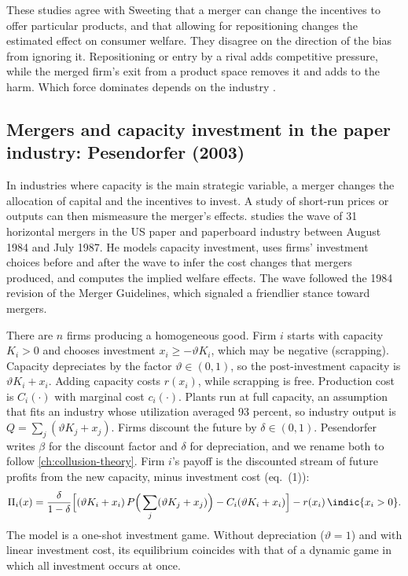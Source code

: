 These studies agree with Sweeting that a merger can change the incentives to offer particular products, and that
allowing for repositioning changes the estimated effect on consumer welfare. They disagree on the direction of the
bias from ignoring it. Repositioning or entry by a rival adds competitive pressure, while the merged firm's exit from
a product space removes it and adds to the harm. Which force dominates depends on the industry
\citep[p.~237]{AskerNocke2021}.

\subsection{Mergers and capacity investment in the paper industry: Pesendorfer (2003)}\label{sec:11-pesendorfer}

In industries where capacity is the main strategic variable, a merger changes the allocation of capital and the
incentives to invest. A study of short-run prices or outputs can then mismeasure the merger's effects.
\citet{Pesendorfer2003} studies the wave of 31 horizontal mergers in the US paper and paperboard industry between
August 1984 and July 1987. He models capacity investment, uses firms' investment choices before and after the wave to
infer the cost changes that mergers produced, and computes the implied welfare effects. The wave followed the 1984
revision of the Merger Guidelines, which signaled a friendlier stance toward mergers.

There are $n$ firms producing a homogeneous good. Firm $i$ starts with capacity $K_i > 0$ and chooses investment
$x_i \ge -\vartheta K_i$, which may be negative (scrapping). Capacity depreciates by the factor $\vartheta \in (0,1)$, so the post-investment
capacity is $\vartheta K_i + x_i$. Adding capacity costs $r(x_i)$, while scrapping is free. Production cost is
$C_i(\cdot)$ with marginal cost $c_i(\cdot)$. Plants run at full capacity, an assumption that fits an industry whose
utilization averaged 93 percent, so industry output is $Q = \sum_j(\vartheta K_j + x_j)$. Firms discount the future by
$\delta \in (0,1)$. Pesendorfer writes $\beta$ for the discount factor and $\delta$ for depreciation, and we rename
both to follow \cref{ch:collusion-theory}. Firm $i$'s payoff is the discounted stream of future profits from the new
capacity, minus investment cost (eq.~(1)):
\begin{equation}\label{eq:11-pes-payoff}
\Pi_i(x) = \frac{\delta}{1 - \delta}\Big[(\vartheta K_i + x_i)\,P\Big(\sum_j(\vartheta K_j + x_j)\Big) - C_i(\vartheta K_i
+ x_i)\Big] - r(x_i)\,\indic\{x_i > 0\}.
\end{equation}
The model is a one-shot investment game. Without depreciation ($\vartheta = 1$) and with linear investment cost, its
equilibrium coincides with that of a dynamic game in which all investment occurs at once.

